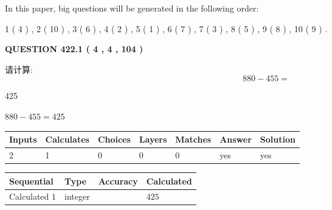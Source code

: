 \documentclass{ctexart}
\begin{document}
In this paper, big questions will be generated in the following order: 
   
   
   1 ( 4 )
 ,
   2 ( 10 )
 ,
   3 ( 6 )
 ,
   4 ( 2 )
 ,
   5 ( 1 )
 ,
   6 ( 7 )
 ,
   7 ( 3 )
 ,
   8 ( 5 )
 ,
   9 ( 8 )
 ,
   10 ( 9 )
 .
  
\vspace{0.2in}
  
{\textbf{\Large{QUESTION
422.1 
 ( 4 , 4 , 104 )
}}}
  
  
 
请计算:
\begin{equation}
880 -   %
455 = \nonumber
\end{equation}
 
 
 
\noindent{}
 
 

425
 
 
\noindent{}
 
 

 
 
 
\noindent{}
 
 

$ %
880 -  %
455=   %
425$
 
 
\noindent{}
 
 

 
   
   
   
   
\noindent\begin{tabular}{|l|l|l|l|l|l|l|}
 \hline
Inputs & Calculates & Choices & Layers & Matches & Answer & Solution \\ \hline
 2  & 
 1  & 
 0
  & 
 0  & 
 0  & 
  yes & 
  yes 
  \\ \hline
 \end{tabular}
   
   
   
   
\noindent{}
   
   
  
  
\noindent\begin{tabular}{|l|l|l|l|}
\hline
 Sequential & Type & Accuracy & Calculated \\ 
\hline
 
 
  Calculated $  1 $ & integer &  & 
  $ 425 $ 
 \\  \hline  
 \end{tabular}
   
\end{document}

